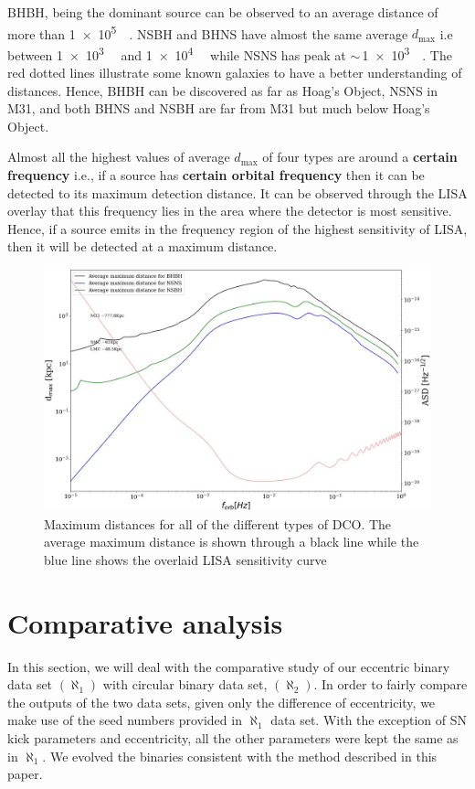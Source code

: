 \documentclass[journal, twocolumn]{IEEEtran}
\newcommand{\kpc}{\kilo\parsec}
\begin{document}
    BHBH, being the dominant source can be observed to an average distance of more than \SI{1e5}{\kpc}.
    NSBH and BHNS have almost the same average $d_{\max}$ i.e between \SI{1e3}{\kpc} and \SI{1e4}{\kpc} while NSNS has peak at $\sim\,$\SI{1e3}{\kpc}.
    The red dotted lines illustrate some known galaxies to have a better understanding of distances.
    Hence, BHBH can be discovered as far as Hoag's Object, NSNS in M31, and both BHNS and NSBH are far from M31 but much below Hoag's Object.

    Almost all the highest values of average $d_{\max}$ of four types are around a \textbf{certain frequency} i.e., if a source has \textbf{certain orbital frequency} then it can be detected to its maximum detection distance.
    It can be observed through the LISA overlay that this frequency lies in the area where the detector is most sensitive.
    Hence, if a source emits in the frequency region of the highest sensitivity of LISA, then it will be detected at a maximum distance.

    \begin{figure}
        \centering
        \includegraphics[width=\linewidth]{images/DMAX}
        \caption{Maximum distances for all of the different types of DCO. The average maximum distance is
        shown through a black line while the blue line shows the overlaid LISA sensitivity curve}
        \label{fig:dmax}
    \end{figure}

    \section{Comparative analysis}
    \label{sec:comparative-analysis}
    In this section, we will deal with the comparative study of our eccentric binary data set $(\aleph_1)$ with circular binary data set, $(\aleph_2)$.
    In order to fairly compare the outputs of the two data sets, given only the difference of eccentricity, we make use of the seed numbers provided in $\aleph_1$ data set.
    With the exception of SN kick parameters and eccentricity, all the other parameters were kept the same as in $\aleph_1$.
    We evolved the binaries consistent with the method described in this paper.
    
\end{document}
